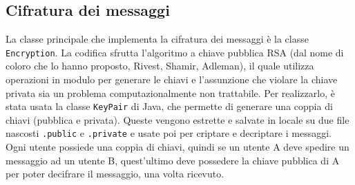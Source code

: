 \subsection{Cifratura dei messaggi}
La classe principale che implementa la cifratura dei messaggi è la classe \texttt{Encryption}.
La codifica sfrutta l'algoritmo a chiave pubblica RSA (dal nome di coloro che
lo hanno proposto, Rivest, Shamir, Adleman), il quale utilizza operazioni in modulo per generare
le chiavi e l'assunzione che violare la chiave privata sia un problema computazionalmente non
trattabile. Per realizzarlo, è stata usata la classe \texttt{KeyPair} di Java, che permette di
generare una coppia di chiavi (pubblica e privata). Queste vengono estrette e salvate in locale su
due file nascosti \texttt{.public} e \texttt{.private} e usate poi per criptare e decriptare i messaggi.
Ogni utente possiede una coppia di chiavi, quindi se un utente A deve spedire un messaggio
ad un utente B, quest'ultimo deve possedere la chiave pubblica di A per poter decifrare
il messaggio, una volta ricevuto.